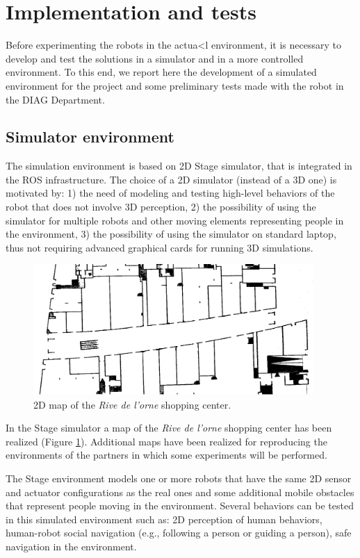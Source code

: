 \section{Implementation and tests}

Before experimenting the robots in the actua<l environment, it is necessary to develop and test the solutions in a simulator and in a more controlled environment. To this end, we report here the development of a simulated environment for the project and some preliminary tests made with the robot in the DIAG Department.


\subsection{Simulator environment}

The simulation environment is based on 2D Stage simulator, that is integrated in the ROS infrastructure. The choice of a 2D simulator (instead of a 3D one) is motivated by: 1) the need of modeling and testing high-level behaviors of the robot that does not involve 3D perception, 2) the possibility of using the simulator for multiple robots and other moving elements representing people in the environment, 3) the possibility of using the simulator on standard laptop, thus not requiring advanced graphical cards for running 3D simulations.

\begin{figure}
\centering
\includegraphics[width=0.95\textwidth]{fig/Rive1.png}
\caption{2D map of the \emph{Rive de l'orne} shopping center.}
\label{fig:stage}
\end{figure}


In the Stage simulator a map of the \emph{Rive de l'orne} shopping center has been realized (Figure \ref{fig:stage}).
Additional maps have been realized for reproducing the environments of the partners in which some experiments will be performed.

The Stage environment models one or more robots that have the same 2D sensor and actuator configurations as the real ones and some additional mobile obstacles that represent people moving in the environment. Several behaviors can be tested in this simulated environment such as: 2D perception of human behaviors, human-robot social navigation (e.g., following a person or guiding a person), safe navigation in the environment.

